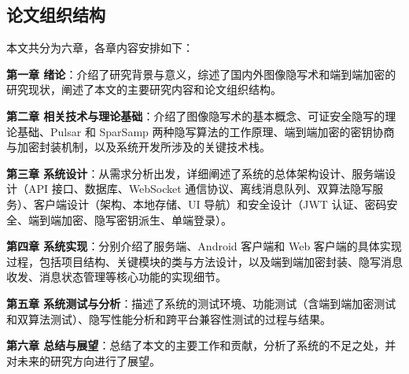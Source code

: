 \subsection{论文组织结构}

本文共分为六章，各章内容安排如下：

\textbf{第一章 绪论}：介绍了研究背景与意义，综述了国内外图像隐写术和端到端加密的研究现状，阐述了本文的主要研究内容和论文组织结构。

\textbf{第二章 相关技术与理论基础}：介绍了图像隐写术的基本概念、可证安全隐写的理论基础、Pulsar 和 SparSamp 两种隐写算法的工作原理、端到端加密的密钥协商与加密封装机制，以及系统开发所涉及的关键技术栈。

\textbf{第三章 系统设计}：从需求分析出发，详细阐述了系统的总体架构设计、服务端设计（API 接口、数据库、WebSocket 通信协议、离线消息队列、双算法隐写服务）、客户端设计（架构、本地存储、UI 导航）和安全设计（JWT 认证、密码安全、端到端加密、隐写密钥派生、单端登录）。

\textbf{第四章 系统实现}：分别介绍了服务端、Android 客户端和 Web 客户端的具体实现过程，包括项目结构、关键模块的类与方法设计，以及端到端加密封装、隐写消息收发、消息状态管理等核心功能的实现细节。

\textbf{第五章 系统测试与分析}：描述了系统的测试环境、功能测试（含端到端加密测试和双算法测试）、隐写性能分析和跨平台兼容性测试的过程与结果。

\textbf{第六章 总结与展望}：总结了本文的主要工作和贡献，分析了系统的不足之处，并对未来的研究方向进行了展望。
